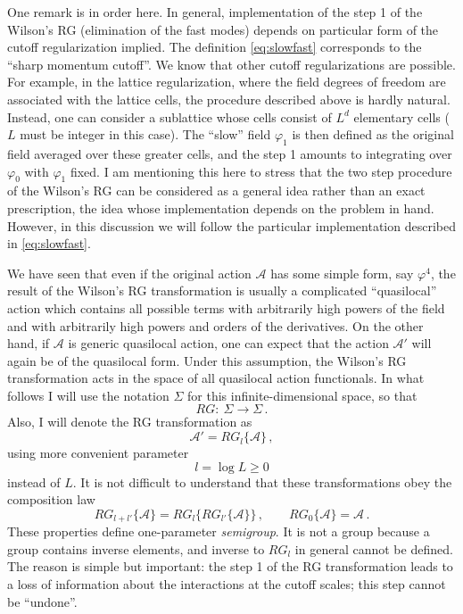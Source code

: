 One remark is in order here. In general, implementation of the step 1 of the
Wilson's RG (elimination of the fast modes) depends on particular form of the
cutoff regularization implied. The definition \eqref{eq:slowfast} corresponds to
the ``sharp momentum cutoff''. We know that other cutoff regularizations are
possible. For example, in the lattice regularization, where the field degrees of
freedom are associated with the lattice cells, the procedure described above is
hardly natural. Instead, one can consider a sublattice whose cells consist of
$L^d$ elementary cells ($L$ must be integer in this case). The ``slow'' field
$\varphi_1$ is then defined as the original field averaged over these greater
cells, and the step 1 amounts to integrating over $\varphi_0$ with $\varphi_1$
fixed. I am mentioning this here to stress that the two step procedure of the
Wilson's RG can be considered as a general idea rather than an exact
prescription, the idea whose implementation depends on the problem in hand.
However, in this discussion we will follow the particular implementation
described in \eqref{eq:slowfast}.

We have seen that even if the original action $\mathcal A$ has some simple form,
say $\varphi^4$, the result of the Wilson's RG transformation is usually a
complicated ``quasilocal'' action which contains all possible terms with
arbitrarily high powers of the field and with arbitrarily high powers and orders
of the derivatives. On the other hand, if $\mathcal A$ is generic quasilocal
action, one can expect that the action $\mathcal A'$ will again be of the
quasilocal form. Under this assumption, the Wilson's RG transformation acts in
the space of all quasilocal action functionals. In what follows I will use the
notation $\Sigma$ for this infinite-dimensional space, so that
\[
RG:\ \Sigma\to\Sigma\,.
\]
Also, I will denote the RG transformation as
\[
\mathcal A'=RG_l\{\mathcal A\}\,,
\]
using more convenient parameter
\[
l=\log L\ge0
\]
instead of $L$. It is not difficult to understand that these transformations
obey the composition law
\begin{equation}\label{eq:semigroup}
RG_{l+l'}\{\mathcal A\}=RG_l\{RG_{l'}\{\mathcal A\}\}\,,\qquad RG_0\{\mathcal A\}=\mathcal A\,.
\end{equation}
These properties define one-parameter \emph{semigroup}. It is not a group
because a group contains inverse elements, and inverse to $RG_l$ in general
cannot be defined. The reason is simple but important: the step 1 of the RG
transformation leads to a loss of information about the interactions at the
cutoff scales; this step cannot be ``undone''.

